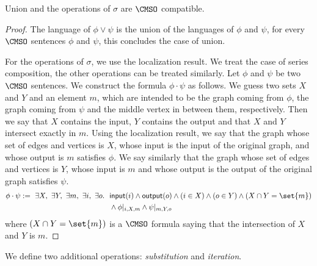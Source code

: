 \begin{proposition}\label{prop:CMSO-def-operations}
Union and the operations of $\sigma$ are $\CMSO$ compatible.
\end{proposition}
\begin{proof}
The language of $\phi  \vee \psi$ is the union of the languages of $\phi$ and $\psi$, for every $\CMSO$ sentences $\phi$ and $\psi$, this concludes the case of union.

For the operations of $\sigma$, we use the localization result. We treat the case of series composition, the other operations can be treated similarly. Let $\phi$ and $\psi$ be two $\CMSO$ sentences. We construct the formula $\phi\cdot\psi$ as follows. We guess two sets $X$ and $Y$ and an element $m$, which are intended to be the graph coming from $\phi$, the graph coming from $\psi$ and the middle vertex in between them, respectively. Then we say that $X$ contains the input, $Y$ contains the output and that $X$ and $Y$ intersect exactly in $m$. Using the localization result, we say that the graph whose set of edges and vertices is $X$,  whose input is the input of the original graph, and whose output is $m$ satisfies $\phi$. We say similarly that  the graph whose set of edges and vertices is $Y$, whose input is $m$ and whose output is the output of the original graph satisfies $\psi$.
\begin{align*}
\phi\cdot\psi:= \ \exists X,\ \exists Y,\ \exists m,\ \exists i,\ \exists  o.\ \ &\mathsf{input}(i)\wedge \mathsf{output}(o)\wedge (i\in X) \wedge (o\in Y) \wedge (X\cap Y=\set{m}) \\ & \wedge \phi|_{i,X, m} \wedge \psi|_{m,Y,o}
\end{align*}
where $(X\cap Y=\set{m})$ is a $\CMSO$ formula saying that the intersection of $X$ and $Y$ is  $m$. 
 \end{proof}

 We define two additional operations: \emph{substitution} and \emph{iteration}.
 
